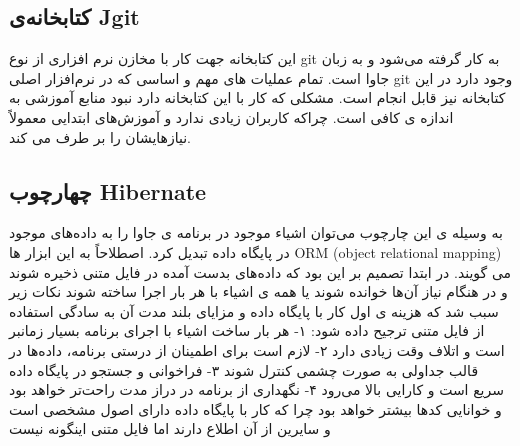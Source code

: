 \subsection{کتابخانه‌ی Jgit}
این کتابخانه جهت کار با مخازن نرم افزاری از نوع git به کار گرفته می‌شود و به زبان جاوا است. تمام عملیات های مهم و اساسی که در نرم‌افزار اصلی git وجود دارد در این کتابخانه نیز قابل انجام است. مشکلی که کار با این کتابخانه دارد نبود منابع آموزشی به اندازه ی کافی است. چراکه کاربران زیادی ندارد و آموزش‌های ابتدایی معمولاً نیازهایشان را بر طرف می کند. 
\subsection{چهارچوب Hibernate }
به وسیله ی این چارچوب می‌توان  اشیاء موجود در برنامه ی جاوا را به داده‌های موجود در پایگاه داده تبدیل کرد. اصطلاحاً به این ابزار ها ORM (object relational mapping)  می گویند. در ابتدا تصمیم بر این بود که داده‌های بدست آمده در فایل متنی ذخیره شوند و در هنگام نیاز آن‌ها خوانده شوند یا همه ی اشیاء با هر بار اجرا ساخته شوند نکات زیر سبب شد که هزینه ی اول کار با پایگاه داده و مزایای بلند مدت آن به سادگی استفاده از فایل متنی ترجیح داده شود:
۱- هر بار ساخت اشیاء با اجرای برنامه بسیار زمانبر است و اتلاف وقت زیادی دارد
۲- لازم است برای اطمینان از درستی برنامه، داده‌ها در قالب جداولی به صورت چشمی کنترل شوند
۳- فراخوانی و جستجو در پایگاه داده سریع است و کارایی بالا می‌رود
۴- نگهداری از برنامه در دراز مدت راحت‌تر خواهد بود و خوانایی کدها بیشتر خواهد بود چرا که کار با پایگاه داده دارای اصول مشخصی است و سایرین از آن اطلاع دارند اما فایل متنی اینگونه نیست
